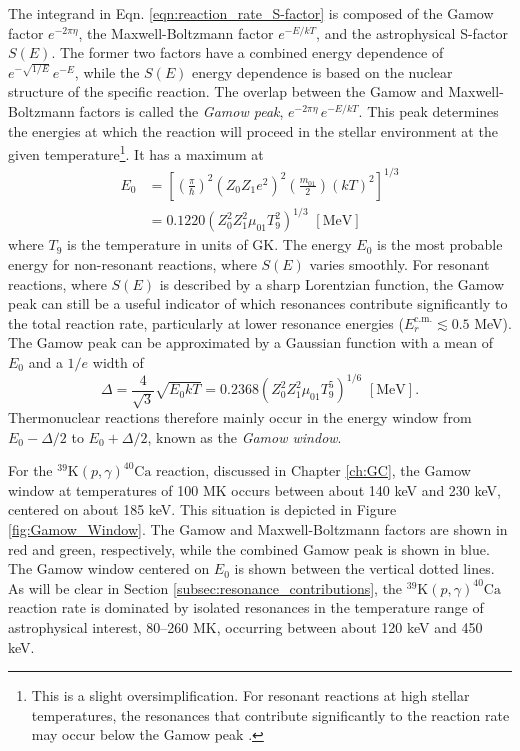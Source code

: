 The integrand in Eqn. \ref{eqn:reaction_rate_S-factor} is composed of the Gamow factor $e^{-2 \pi \eta}$, the Maxwell-Boltzmann factor $e^{-E/kT}$, and the astrophysical S-factor $S(E)$. The former two factors have a combined energy dependence of $e^{-\sqrt{1/E}} \, e^{-E}$, while the $S(E)$ energy dependence is based on the nuclear structure of the specific reaction. The overlap between the Gamow and Maxwell-Boltzmann factors is called the \emph{Gamow peak}, $e^{-2 \pi \eta} \, e^{-E/kT}$. This peak determines the energies at which the reaction will proceed in the stellar environment at the given temperature\footnote{This is a slight oversimplification. For resonant reactions at high stellar temperatures, the resonances that contribute significantly to the reaction rate may occur below the Gamow peak \cite{Iliadis2015}.}. It has a maximum at
\begin{align}
E_{0} &= \left[ \left(\frac{\pi}{\hbar}\right)^{2} (Z_{0} Z_{1} e^{2})^{2} \left(\frac{m_{01}}{2}\right) (kT)^{2} \right]^{1/3} \nonumber \\
&= 0.1220 \left(Z_{0}^{2} Z_{1}^{2} \mu_{01} T_{9}^{2} \right)^{1/3} \,\, [\mathrm{MeV}]
\end{align}
where $T_{9}$ is the temperature in units of GK. The energy $E_{0}$ is the most probable energy for non-resonant reactions, where $S(E)$ varies smoothly. For resonant reactions, where $S(E)$ is described by a sharp Lorentzian function, the Gamow peak can still be a useful indicator of which resonances contribute significantly to the total reaction rate, particularly at lower resonance energies ($E_{r}^{\mathrm{c.m.}} \lesssim 0.5$ MeV). The Gamow peak can be approximated by a Gaussian function with a mean of $E_{0}$ and a $1/e$ width of
\begin{equation}
\Delta = \frac{4}{\sqrt{3}} \sqrt{E_{0} k T} = 0.2368 \left(Z_{0}^{2} Z_{1}^{2} \mu_{01} T_{9}^{5}\right)^{1/6} \,\, [\mathrm{MeV}].
\end{equation}
Thermonuclear reactions therefore mainly occur in the energy window from $E_{0} - \Delta/2$ to $E_{0} + \Delta/2$, known as the \emph{Gamow window}.

For the $^{39}\mathrm{K}(p,\gamma)^{40}\mathrm{Ca}$ reaction, discussed in Chapter \ref{ch:GC}, the Gamow window at temperatures of 100 MK occurs between about 140 keV and 230 keV, centered on about 185 keV. This situation is depicted in Figure \ref{fig:Gamow_Window}. The Gamow and Maxwell-Boltzmann factors are shown in red and green, respectively, while the combined Gamow peak is shown in blue. The Gamow window centered on $E_{0}$ is shown between the vertical dotted lines. As will be clear in Section \ref{subsec:resonance_contributions}, the $^{39}\mathrm{K}(p,\gamma)^{40}\mathrm{Ca}$ reaction rate is dominated by isolated resonances in the temperature range of astrophysical interest, 80--260 MK, occurring between about 120 keV and 450 keV.

